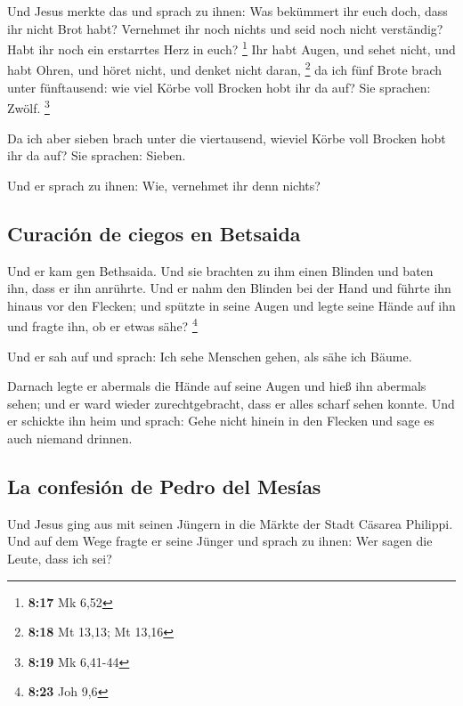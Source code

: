  Und Jesus merkte das und sprach zu ihnen: Was bekümmert
ihr euch doch, dass ihr nicht Brot habt? Vernehmet ihr noch nichts und
seid noch nicht verständig? Habt ihr noch ein erstarrtes Herz in euch?
\footnote{\textbf{8:17} Mk 6,52}  Ihr habt Augen, und
sehet nicht, und habt Ohren, und höret nicht, und denket nicht daran,
\footnote{\textbf{8:18} Mt 13,13; Mt 13,16}  da ich fünf
Brote brach unter fünftausend: wie viel Körbe voll Brocken hobt ihr da
auf? Sie sprachen: Zwölf. \footnote{\textbf{8:19} Mk 6,41-44}

 Da ich aber sieben brach unter die viertausend, wieviel
Körbe voll Brocken hobt ihr da auf? Sie sprachen: Sieben.

 Und er sprach zu ihnen: Wie, vernehmet ihr denn nichts?

\hypertarget{curaciuxf3n-de-ciegos-en-betsaida}{%
\subsection{Curación de ciegos en
Betsaida}\label{curaciuxf3n-de-ciegos-en-betsaida}}

 Und er kam gen Bethsaida. Und sie brachten zu ihm einen
Blinden und baten ihn, dass er ihn anrührte.  Und er nahm
den Blinden bei der Hand und führte ihn hinaus vor den Flecken; und
spützte in seine Augen und legte seine Hände auf ihn und fragte ihn, ob
er etwas sähe? \footnote{\textbf{8:23} Joh 9,6}

 Und er sah auf und sprach: Ich sehe Menschen gehen, als
sähe ich Bäume.

 Darnach legte er abermals die Hände auf seine Augen und
hieß ihn abermals sehen; und er ward wieder zurechtgebracht, dass er
alles scharf sehen konnte.  Und er schickte ihn heim und
sprach: Gehe nicht hinein in den Flecken und sage es auch niemand
drinnen.

\hypertarget{la-confesiuxf3n-de-pedro-del-mesuxedas}{%
\subsection{La confesión de Pedro del
Mesías}\label{la-confesiuxf3n-de-pedro-del-mesuxedas}}

 Und Jesus ging aus mit seinen Jüngern in die Märkte der
Stadt Cäsarea Philippi. Und auf dem Wege fragte er seine Jünger und
sprach zu ihnen: Wer sagen die Leute, dass ich sei?

